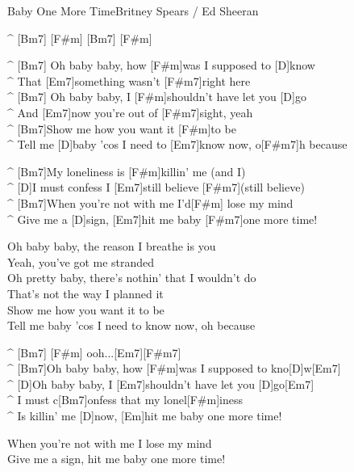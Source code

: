 \begin{song}{Baby One More Time}{Britney Spears / Ed Sheeran}

\begin{guitar}
^ [Bm7] [F#m] [Bm7] [F#m]\\

\end{guitar}
\begin{guitar}
^ [Bm7]   Oh baby baby, how [F#m]was I supposed to [D]know\\
^ That [Em7]something wasn't [F#m7]right here\\
^ [Bm7]   Oh baby baby, I [F#m]shouldn't have let you [D]go\\
^ And [Em7]now you're out of [F#m7]sight, yeah\\
^ [Bm7]Show me how you want it [F#m]to be\\
^ Tell me [D]baby 'cos I need to [Em7]know now, o[F#m7]h because\\
\end{guitar}

\begin{guitar}
^ [Bm7]My loneliness is [F#m]killin' me (and I)\\
^ [D]I must confess I [Em7]still believe [F#m7](still believe)\\
^ [Bm7]When you're not with me I'd[F#m] lose my mind\\
^ Give me a [D]sign, [Em7]hit me baby [F#m7]one more time!\\
\end{guitar}



\begin{guitar}
Oh baby baby, the reason I breathe is you\\
Yeah, you've got me stranded\\
Oh pretty baby, there's nothin' that I wouldn't do\\
That's not the way I planned it\\
Show me how you want it to be\\
Tell me baby 'cos I need to know now, oh because\\
\end{guitar}



\begin{guitar}
^ [Bm7]     [F#m]    ooh...[Em7][F#m7]\\
^ [Bm7]Oh baby baby, how [F#m]was I supposed to kno[D]w[Em7]\\
^ [D]Oh baby baby, I [Em7]shouldn't have let you [D]go[Em7]\\
^ I must c[Bm7]onfess that my lonel[F#m]iness\\
^ Is killin' me [D]now, [Em]hit me baby one more time!\\
\end{guitar}



\begin{guitar}
When you're not with me I lose my mind\\
Give me a sign, hit me baby one more time!\\
\end{guitar}
\end{song}
